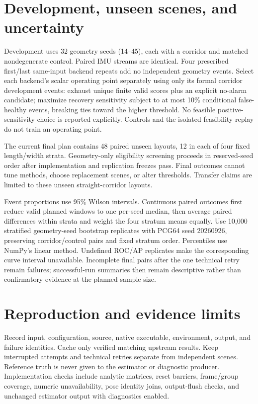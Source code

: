 \documentclass[11pt,a4paper]{article}
\begin{document}
\section{Development, unseen scenes, and uncertainty}
Development uses 32 geometry seeds (14--45), each with a corridor and matched
nondegenerate control. Paired IMU streams are identical. Four prescribed
first/last same-input backend repeats add no independent geometry events.
Select each backend's scalar operating point separately using only its formal
corridor development events: exhaust unique finite valid scores plus an
explicit no-alarm candidate; maximize recovery sensitivity subject to at most
10\% conditional false-healthy events, breaking ties toward the higher
threshold. No feasible positive-sensitivity choice is reported explicitly.
Controls and the isolated feasibility replay do not train an operating point.

The current final plan contains 48 paired unseen layouts, 12 in each of four
fixed length/width strata. Geometry-only eligibility screening proceeds in
reserved-seed order after implementation and replication freezes pass. Final
outcomes cannot tune methods, choose replacement scenes, or alter thresholds.
Transfer claims are limited to these unseen straight-corridor layouts.

Event proportions use 95\% Wilson intervals. Continuous paired outcomes first
reduce valid planned windows to one per-seed median, then average paired
differences within strata and weight the four stratum means equally. Use
10,000 stratified geometry-seed bootstrap replicates with PCG64 seed 20260926,
preserving corridor/control pairs and fixed stratum order. Percentiles use
NumPy's linear method. Undefined ROC/AP replicates make the corresponding
curve interval unavailable. Incomplete final pairs after the one technical
retry remain failures; successful-run summaries then remain descriptive
rather than confirmatory evidence at the planned sample size.

\section{Reproduction and evidence limits}
Record input, configuration, source, native executable, environment, output,
and failure identities. Cache only verified matching upstream results. Keep
interrupted attempts and technical retries separate from independent scenes.
Reference truth is never given to the estimator or diagnostic producer.
Implementation checks include analytic matrices, reset barriers, frame/group
coverage, numeric unavailability, pose identity joins, output-flush checks,
and unchanged estimator output with diagnostics enabled.
\end{document}
